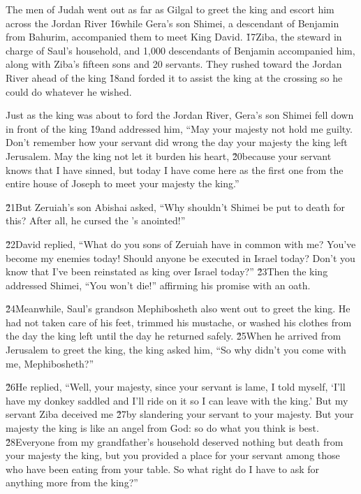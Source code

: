 The men of Judah went out as far as Gilgal to greet the king and escort him across the Jordan River \v{16}while Gera's son Shimei, a descendant of Benjamin from Bahurim, accompanied them to meet King David. \v{17}Ziba, the steward in charge of Saul's household, and 1,000 descendants of Benjamin accompanied him, along with Ziba's fifteen sons and 20 servants. They rushed toward the Jordan River ahead of the king \v{18}and forded it to assist the king at the crossing so he could do whatever he wished.

Just as the king was about to ford the Jordan River, Gera's son Shimei fell down in front of the king \v{19}and addressed him, ``May your majesty not hold me guilty. Don't remember how your servant did wrong the day your majesty the king left Jerusalem. May the king not let it burden his heart, \v{20}because your servant knows that I have sinned, but today I have come here as the first one from the entire house of Joseph to meet your majesty the king.''

\v{21}But Zeruiah's son Abishai asked, ``Why shouldn't Shimei be put to death for this? After all, he cursed the 's anointed!''

\v{22}David replied, ``What do you sons of Zeruiah have in common with me? You've become my enemies today! Should anyone be executed in Israel today? Don't you know that I've been reinstated as king over Israel today?'' \v{23}Then the king addressed Shimei, ``You won't die!'' affirming his promise with an oath.

\v{24}Meanwhile, Saul's grandson Mephibosheth also went out to greet the king. He had not taken care of his feet, trimmed his mustache, or washed his clothes from the day the king left until the day he returned safely. \v{25}When he arrived from Jerusalem to greet the king, the king asked him, ``So why didn't you come with me, Mephibosheth?''

\v{26}He replied, ``Well, your majesty, since your servant is lame, I told myself, `I'll have my donkey saddled and I'll ride on it so I can leave with the king.' But my servant Ziba deceived me \v{27}by slandering your servant to your majesty. But your majesty the king is like an angel from God: so do what you think is best. \v{28}Everyone from my grandfather's household deserved nothing but death from your majesty the king, but you provided a place for your servant among those who have been eating from your table. So what right do I have to ask for anything more from the king?''

